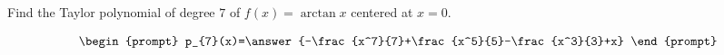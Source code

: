 \documentclass{ximera}
\author{Gregory Hartman \and Matthew Carr}
\begin{document}
\begin{exercise}




Find the Taylor polynomial of degree $7$ of $f(x)=\arctan x$ centered at $x=0$.

\[
\begin{prompt}
p_{7}(x)=\answer{-\frac{x^7}{7}+\frac{x^5}{5}-\frac{x^3}{3}+x}
\end{prompt}
\]

\end{exercise}
\end{document}
